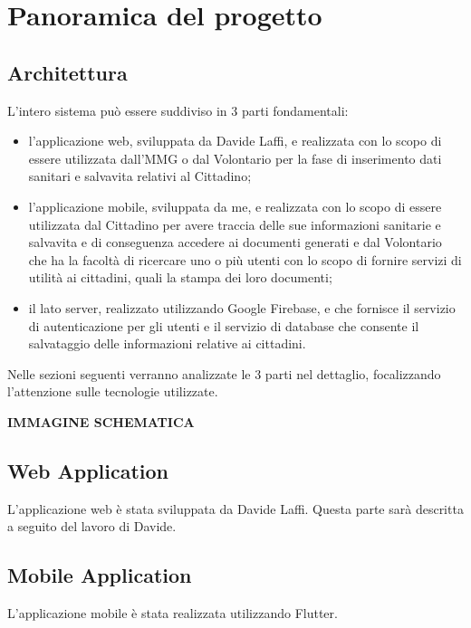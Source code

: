 \documentclass[12pt,a4paper,twoside,openright,titlepage]{book}
\begin{document}
\chapter{Panoramica del progetto}

\section{Architettura}
L'intero sistema può essere suddiviso in 3 parti fondamentali:
\begin{itemize}
\item l'applicazione web, sviluppata da Davide Laffi, e realizzata con lo scopo di essere utilizzata dall'MMG o dal Volontario per la fase di inserimento dati sanitari e salvavita relativi al Cittadino;
\item l'applicazione mobile, sviluppata da me, e realizzata con lo scopo di essere utilizzata dal Cittadino per avere traccia delle sue informazioni sanitarie e salvavita e di conseguenza accedere ai documenti generati e dal Volontario che ha la facoltà di ricercare uno o più utenti con lo scopo di fornire servizi di utilità ai cittadini, quali la stampa dei loro documenti;
\item il lato server, realizzato utilizzando Google Firebase, e che fornisce il servizio di autenticazione per gli utenti e il servizio di database che consente il salvataggio delle informazioni relative ai cittadini.
\end{itemize}
Nelle sezioni seguenti verranno analizzate le 3 parti nel dettaglio, focalizzando l'attenzione sulle tecnologie utilizzate.\newline

\textbf{IMMAGINE SCHEMATICA}

\section{Web Application}
L'applicazione web è stata sviluppata da Davide Laffi. Questa parte sarà descritta a seguito del lavoro di Davide.

\section{Mobile Application}
L'applicazione mobile è stata realizzata utilizzando Flutter.
\end{document}
